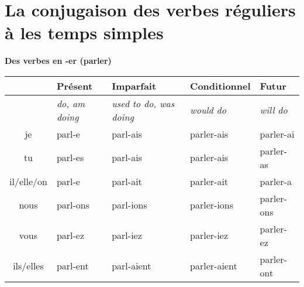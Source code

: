 

\section{La conjugaison des verbes r\'eguliers \`a les temps simples}
\setcounter{theorem}{0}
\setcounter{equation}{0}

\newcommand{\stemPresent}{parl}
\newcommand{\stemFutur}{parler}
\begin{center}
\textbf{Des verbes en -er (parler)}
\vskip 0.1cm
\begin{tabular}{|c||L{3cm}|L{3cm}|L{3cm}|L{3cm}|}
\hline
& Pr\'esent & Imparfait & Conditionnel & Futur \\
\hline
& \textit{do, am doing} & \textit{used to do, was doing} & \textit{would do} & \textit{will do} \\
\hline\hline
je            &	\stemPresent-e	&	\stemPresent-ais	&	\stemFutur-ais	 &	\stemFutur-ai	\\
tu            &	\stemPresent-es	&	\stemPresent-ais	&	\stemFutur-ais	&	\stemFutur-as	\\
il/elle/on  &	\stemPresent-e	&	\stemPresent-ait	&	\stemFutur-ait	&	\stemFutur-a	\\
nous       &	\stemPresent-ons	&	\stemPresent-ions	&	\stemFutur-ions	&	\stemFutur-ons	\\
vous       &	\stemPresent-ez	&	\stemPresent-iez	&	\stemFutur-iez		&	\stemFutur-ez	\\
ils/elles   &	\stemPresent-ent	&	\stemPresent-aient	&	\stemFutur-aient	&	\stemFutur-ont	\\
\hline
\end{tabular}
\end{center}

